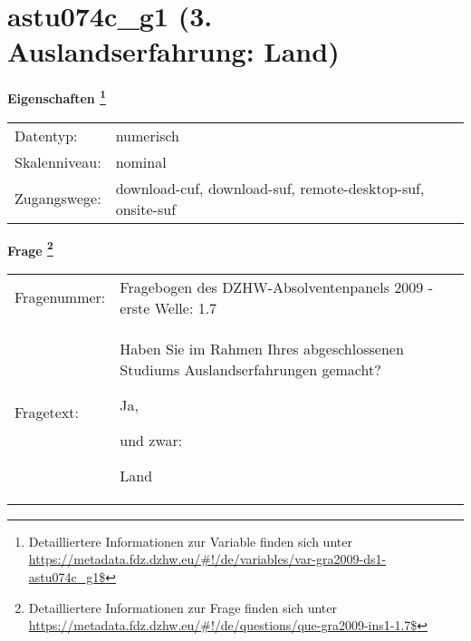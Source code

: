 
    \setcounter{footnote}{0}

    \vspace*{-1.8cm}
	\section{astu074c\_g1 (3. Auslandserfahrung: Land)}
	\label{section:astu074c_g1}



    \vspace*{0.5cm}
    \noindent\textbf{Eigenschaften
	\footnote{Detailliertere Informationen zur Variable finden sich unter
		\url{https://metadata.fdz.dzhw.eu/\#!/de/variables/var-gra2009-ds1-astu074c_g1$}}}\\
	\begin{tabularx}{\hsize}{@{}lX}
	Datentyp: & numerisch \\
	Skalenniveau: & nominal \\
	Zugangswege: &
	  download-cuf, 
	  download-suf, 
	  remote-desktop-suf, 
	  onsite-suf
 \\
    \end{tabularx}



				\vspace*{0.5cm}
                \noindent\textbf{Frage
	                \footnote{Detailliertere Informationen zur Frage finden sich unter
		              \url{https://metadata.fdz.dzhw.eu/\#!/de/questions/que-gra2009-ins1-1.7$}}}\\
				\begin{tabularx}{\hsize}{@{}lX}
					Fragenummer: &
					  Fragebogen des DZHW-Absolventenpanels 2009 - erste Welle:
					  1.7
 \\
					Fragetext: & Haben Sie im Rahmen Ihres abgeschlossenen Studiums Auslandserfahrungen gemacht?\par  Ja,\par  und zwar:\par  Land \\
				\end{tabularx}





